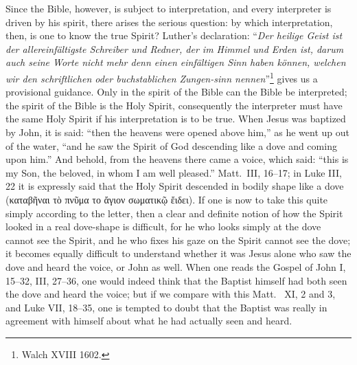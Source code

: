 \documentclass[12pt,a4paper]{article}
\newcommand{\opage}[1]{\marginnote{\footnotesize\textit{[#1]}}}
\begin{document}
Since the Bible, however, is subject to interpretation, and every
interpreter is driven by his spirit, there arises the serious question:
\opage{20}by which interpretation, then, is one to know the true
Spirit? Luther's declaration: ``\textit{Der heilige Geist ist der allereinfältigste
Schreiber und Redner, der im Himmel und Erden ist,
darum auch seine Worte nicht mehr denn einen einfältigen Sinn
haben können, welchen wir den schriftlichen oder buchstablichen
Zungen-sinn nennen}''\footnote{Walch XVIII 1602.} %
gives us a provisional guidance. Only in
the spirit of the Bible can the Bible be interpreted; the spirit of the Bible is the Holy
Spirit, consequently the interpreter must have the same Holy Spirit
if his interpretation is to be true. When Jesus was baptized by
John, it is said: ``then the heavens were opened above him,'' as he
went up out of the water, ``and he saw the Spirit of God descending like a dove
and coming upon him.'' And behold, from the heavens there came a voice,
which said: ``this is my Son, the beloved, in whom I am
well pleased.'' Matt.\ III, 16--17; in Luke III, 22 it is expressly
said that the Holy Spirit descended in bodily shape like a
dove (καταβῆναι τὸ πνῦμα το ἄγιον σωματικῷ ἔιδει). If one is
now to take this quite simply according to the letter, then a clear and
definite notion of how the Spirit looked in a
real dove-shape is difficult, for he who looks simply at
the dove cannot see the Spirit, and he who fixes his gaze on the
Spirit cannot see the dove; it becomes equally difficult to understand
whether it was Jesus alone who saw the dove and heard the voice, or
John as well. When one reads the Gospel of John I, 15--32,
III, 27--36, one would indeed think that the Baptist himself had both
seen the dove and heard the voice; but if we compare with this Matt.\ %
XI, 2 and 3, and Luke VII, 18--35, one is tempted to doubt
that the Baptist was really in agreement with himself about what he
had actually seen and heard.
\end{document}
